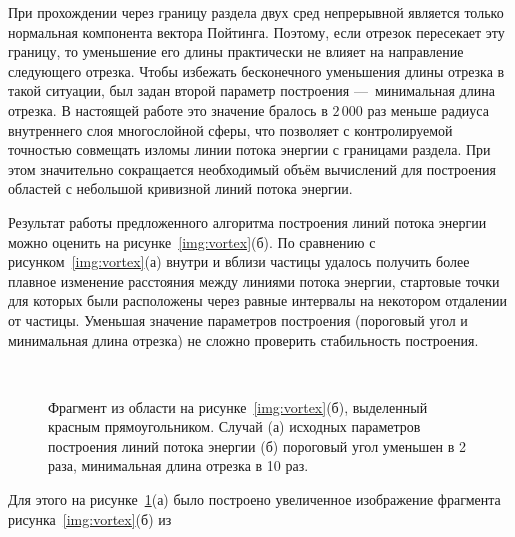 При прохождении через границу раздела двух сред непрерывной является
только нормальная компонента вектора Пойтинга. Поэтому, если отрезок
пересекает эту границу, то уменьшение его длины практически не влияет
на направление следующего отрезка. Чтобы избежать бесконечного
уменьшения длины отрезка в такой ситуации, был задан второй параметр
построения ---~минимальная длина отрезка.  В настоящей работе это
значение бралось в $2\,000$ раз меньше радиуса внутреннего слоя
многослойной сферы, что позволяет с контролируемой точностью
совмещать изломы линии потока энергии с границами раздела. При этом
значительно сокращается необходимый объём вычислений для построения
областей с небольшой кривизной линий потока энергии.

Результат работы предложенного алгоритма построения линий потока
энергии можно оценить на рисунке~\ref{img:vortex}(б).  По сравнению с
рисунком~\ref{img:vortex}(а) внутри и вблизи частицы удалось получить
более плавное изменение расстояния между линиями потока энергии,
стартовые точки для которых были расположены через равные интервалы на
некотором отдалении от частицы.  Уменьшая значение параметров
построения (пороговый угол и минимальная длина отрезка) не сложно
проверить стабильность построения.
\begin{figure}[t] 
{\center
  \begin{minipage}[ht]{0.49\linewidth}        
  \end{minipage}
  \begin{minipage}[ht]{0.49\linewidth}
  \end{minipage}
}\\
{\center
  \begin{minipage}[ht]{0.49\linewidth}        
  \end{minipage}
  \begin{minipage}[ht]{0.49\linewidth}
  \end{minipage}
}
  \caption{Фрагмент из области на рисунке~\ref{img:vortex}(б),
    выделенный красным прямоугольником. Случай (а) исходных параметров построения
    линий потока энергии (б) пороговый угол уменьшен в 2 раза,
    минимальная длина отрезка в 10 раз.\label{img:vortex-crop}}
\end{figure}
Для этого на рисунке~\ref{img:vortex-crop}(а) было построено
увеличенное изображение фрагмента рисунка~\ref{img:vortex}(б) из
